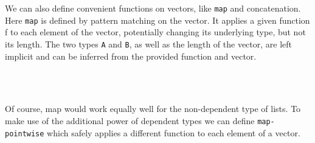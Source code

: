 We can also define convenient functions on vectors, like \texttt{map} and concatenation.
Here \texttt{map} is defined by pattern matching on the vector. It applies a given function f to each element
of the vector, potentially changing its underlying type, but not its length.
The two types \texttt{A} and \texttt{B}, as well as the length of the vector, are left implicit and can
be inferred from the provided function and vector.
\begin{code}%
\>[0]\AgdaSpace{}%
\AgdaSymbol{:}\AgdaSpace{}%
\AgdaSymbol{\{}\AgdaSpace{}%
\AgdaSpace{}%
\AgdaSymbol{:}\AgdaSpace{}%
\AgdaSymbol{\}\{}\AgdaSpace{}%
\AgdaSymbol{:}\AgdaSpace{}%
\AgdaSymbol{\}}\AgdaSpace{}%
\AgdaSpace{}%
\AgdaSymbol{(}\AgdaSpace{}%
\AgdaSpace{}%
\AgdaSymbol{)}\AgdaSpace{}%
\AgdaSpace{}%
\AgdaSpace{}%
\AgdaSpace{}%
\AgdaSpace{}%
\AgdaSpace{}%
\AgdaSpace{}%
\AgdaSpace{}%
\<%
\\
\>[0]\AgdaSpace{}%
\AgdaSymbol{\AgdaUnderscore{}}\AgdaSpace{}%
\AgdaInductiveConstructor{[]}\AgdaSpace{}%
\AgdaSymbol{=}\AgdaSpace{}%
\AgdaInductiveConstructor{[]}\<%
\\
\>[0]\AgdaSpace{}%
\AgdaSpace{}%
\AgdaSymbol{(}\AgdaSpace{}%
\AgdaOperator{\AgdaInductiveConstructor{::}}\AgdaSpace{}%
\AgdaSymbol{)}\AgdaSpace{}%
\AgdaSymbol{=}\AgdaSpace{}%
\AgdaSymbol{(}\AgdaSpace{}%
\AgdaSymbol{)}\AgdaSpace{}%
\AgdaOperator{\AgdaInductiveConstructor{::}}\AgdaSpace{}%
\AgdaSymbol{(}\AgdaSpace{}%
\AgdaSpace{}%
\AgdaSymbol{)}\<%
\end{code}
Of course, map would work equally well for the non-dependent type of lists.
To make use of the additional power of dependent types we can define \texttt{map-pointwise}
which safely applies a different function to each element of a vector.
